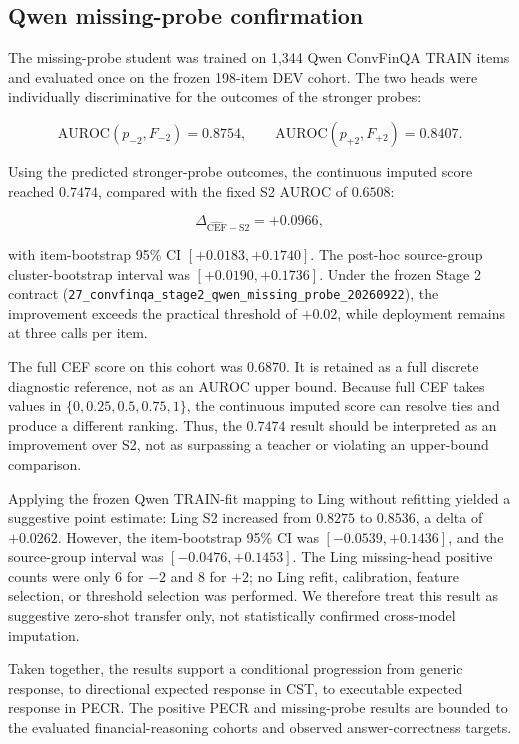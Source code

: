 \documentclass[11pt]{article}
\begin{document}
\subsection{Qwen missing-probe confirmation}

The missing-probe student was trained on 1,344 Qwen ConvFinQA TRAIN items and evaluated once on the frozen 198-item DEV cohort. The two heads were individually discriminative for the outcomes of the stronger probes:

\[
\mathrm{AUROC}(p_{-2},F_{-2})=0.8754,
\qquad
\mathrm{AUROC}(p_{+2},F_{+2})=0.8407.
\]

Using the predicted stronger-probe outcomes, the continuous imputed score reached \(0.7474\), compared with the fixed S2 AUROC of \(0.6508\):

\[
\Delta_{\widehat{\mathrm{CEF}}-\mathrm{S2}}=+0.0966,
\]

with item-bootstrap 95\% CI \([+0.0183,+0.1740]\). The post-hoc source-group cluster-bootstrap interval was \([+0.0190,+0.1736]\). Under the frozen Stage 2 contract (\texttt{27\_convfinqa\_stage2\_qwen\_missing\_probe\_20260922}), the improvement exceeds the practical threshold of \(+0.02\), while deployment remains at three calls per item.

The full CEF score on this cohort was \(0.6870\). It is retained as a full discrete diagnostic reference, not as an AUROC upper bound. Because full CEF takes values in \(\{0,0.25,0.5,0.75,1\}\), the continuous imputed score can resolve ties and produce a different ranking. Thus, the \(0.7474\) result should be interpreted as an improvement over S2, not as surpassing a teacher or violating an upper-bound comparison.

Applying the frozen Qwen TRAIN-fit mapping to Ling without refitting yielded a suggestive point estimate: Ling S2 increased from \(0.8275\) to \(0.8536\), a delta of \(+0.0262\). However, the item-bootstrap 95\% CI was \([-0.0539,+0.1436]\), and the source-group interval was \([-0.0476,+0.1453]\). The Ling missing-head positive counts were only 6 for \(-2\) and 8 for \(+2\); no Ling refit, calibration, feature selection, or threshold selection was performed. We therefore treat this result as suggestive zero-shot transfer only, not statistically confirmed cross-model imputation.

Taken together, the results support a conditional progression from generic response, to directional expected response in CST, to executable expected response in PECR. The positive PECR and missing-probe results are bounded to the evaluated financial-reasoning cohorts and observed answer-correctness targets.
\end{document}
